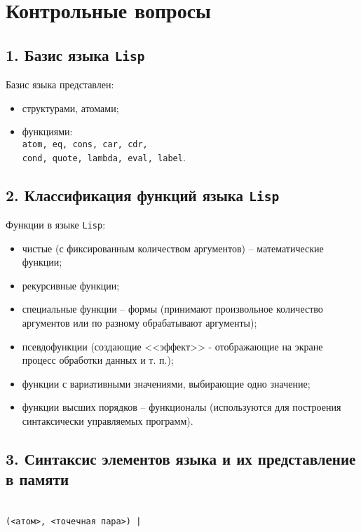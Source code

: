 \section*{Контрольные вопросы}

\subsection*{1. Базис языка {\texttt{Lisp}}}

Базис языка представлен:
\begin{itemize}
	\item структурами, атомами;
	\item функциями:\\
	{\texttt{atom, eq, cons, car, cdr,}}\\
	{\texttt{cond, quote, lambda, eval, label}}.
\end{itemize}

\subsection*{2. Классификация функций языка {\texttt{Lisp}}}

Функции в языке {\texttt{Lisp}}:
\begin{itemize}
	\item чистые (с фиксированным количеством аргументов) -- математические функции;
	\item рекурсивные функции;
	\item специальные функции -- формы (принимают произвольное количество аргументов или по разному обрабатывают аргументы);
	\item псевдофункции (создающие <<эффект>> - отображающие на экране процесс обработки данных и т. п.);
	\item функции с вариативными значениями, выбирающие одно значение;
	\item функции высших порядков -- функционалы (используются для построения синтаксически управляемых программ).
\end{itemize}

\subsection*{3. Синтаксис элементов языка и их представление в памяти}


\\

{\texttt{(<атом>, <точечная пара>) |}}\\


